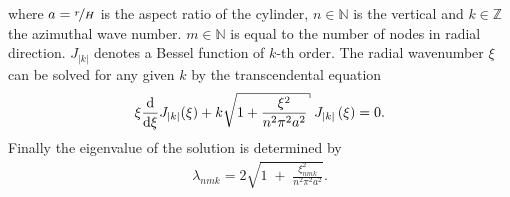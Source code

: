 where $a=\nicefrac{r}{H}$ is the aspect ratio of the cylinder,
$n\in\mathbb{N}$ is the vertical and $k\in\mathbb{Z}$ the azimuthal wave number.
$m\in\mathbb{N}$ is equal to the number of nodes in radial direction.
$J_{|k|}$ denotes a Bessel function of $k$-th order.
The radial wavenumber $\xi$  can be solved for any given $k$ by the transcendental equation
\begin{align}
    \xi \frac{\dif}{\dif \xi}J_{|k|}(\xi) + k \sqrt{1 + \frac{\xi^2}{n^2\pi^2a^2}} \; J_{|k|}\left(\xi\right) = 0.
\end{align}
Finally the eigenvalue of the solution is determined by
\begin{align}
    \lambda_{nmk} = 2\sqrt{1 \; + \;\frac{ \xi_{nmk}^2}{n^2\pi^2a^2}}.
\end{align}

%
%
%




